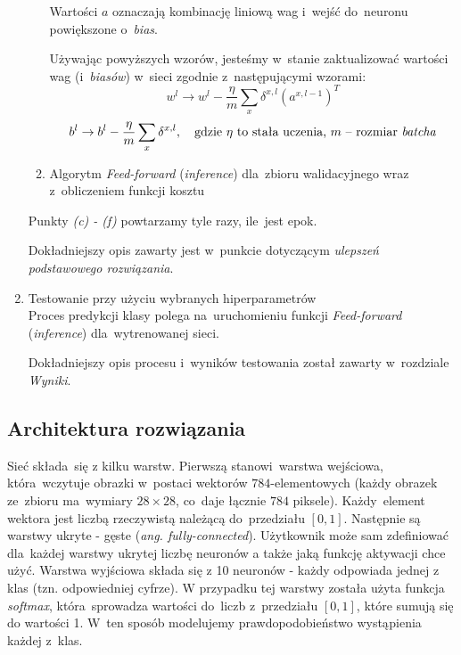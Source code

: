 \documentclass[11pt, a4paper]{article}
\begin{document}
\begin{enumerate}
\begin{enumerate}
        Wartości $a$ oznaczają kombinację liniową wag i~wejść do~neuronu powiększone o~\textit{bias}.
        
        Używając powyższych wzorów, jesteśmy w~stanie zaktualizować wartości wag (i~\textit{biasów}) w~sieci zgodnie z~następującymi wzorami:
        \begin{equation}
            w^l \rightarrow w^l - \frac{\eta}{m}\sum_x \delta^{x,l}(a^{x,l-1})^T
        \end{equation}
        \begin{equation}
            b^l \rightarrow b^l - \frac{\eta}{m}\sum_x\delta^{x,l}, \quad \text{gdzie $\eta$ to stała uczenia, $m$ -- rozmiar \textit{batcha}}
        \end{equation}
        
        \item Algorytm \textit{Feed-forward} (\textit{inference}) dla~zbioru walidacyjnego wraz z~obliczeniem funkcji kosztu
    \end{enumerate}
    Punkty \textit{(c) - (f)} powtarzamy tyle razy, ile~jest epok.
    
     Dokładniejszy opis zawarty jest w~punkcie dotyczącym \textit{ulepszeń podstawowego rozwiązania}.
    \item Testowanie przy użyciu wybranych hiperparametrów \\
    Proces predykcji klasy polega na~uruchomieniu funkcji \textit{Feed-forward} (\textit{inference}) dla~wytrenowanej sieci.
    
    Dokładniejszy opis procesu i~wyników testowania został zawarty w~rozdziale \textit{Wyniki}.
\end{enumerate}

\subsection{Architektura rozwiązania}
Sieć składa~się z kilku warstw. Pierwszą stanowi~warstwa wejściowa, która~wczytuje obrazki w~postaci wektorów $784$-elementowych
(każdy obrazek ze~zbioru ma~wymiary $28 \times 28$, co~daje łącznie $784$ piksele). Każdy~element wektora jest liczbą rzeczywistą należącą do~przedziału $[0, 1]$. Następnie są warstwy ukryte - gęste (\textit{ang. fully-connected}). Użytkownik może sam zdefiniować dla~każdej warstwy ukrytej liczbę neuronów a także jaką funkcję aktywacji chce użyć. Warstwa wyjściowa składa się z 10 neuronów - każdy odpowiada jednej z klas (tzn. odpowiedniej cyfrze). W przypadku tej warstwy została użyta funkcja \textit{softmax}, która~sprowadza wartości do~liczb z~przedziału $[0, 1]$, które sumują się do wartości 1. W~ten sposób modelujemy prawdopodobieństwo wystąpienia każdej z~klas.
\end{document}
